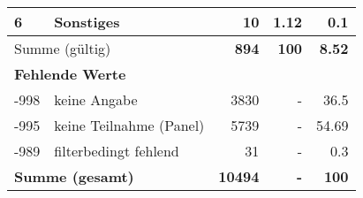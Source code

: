 \begin{longtable}{lXrrr}
     6 &
     \multicolumn{1}{X}{ Sonstiges   } &


       \num{10} &
       \num[round-mode=places,round-precision=2]{1.12} &
         \num[round-mode=places,round-precision=2]{0.1} \\
     \midrule
     \multicolumn{2}{l}{Summe (gültig)} &
       \textbf{\num{894}} &
     \textbf{\num{100}} &
       \textbf{\num[round-mode=places,round-precision=2]{8.52}} \\
     \multicolumn{5}{l}{\textbf{Fehlende Werte}}\\
       -998 &
       keine Angabe &
         \num{3830} &
        - &
         \num[round-mode=places,round-precision=2]{36.5} \\
       -995 &
       keine Teilnahme (Panel) &
         \num{5739} &
        - &
         \num[round-mode=places,round-precision=2]{54.69} \\
       -989 &
       filterbedingt fehlend &
         \num{31} &
        - &
         \num[round-mode=places,round-precision=2]{0.3} \\
     \midrule
     \multicolumn{2}{l}{\textbf{Summe (gesamt)}} &
          \textbf{\num{10494}} &
        \textbf{-} &
        \textbf{\num{100}} \\
     \bottomrule
     \end{longtable}
     
